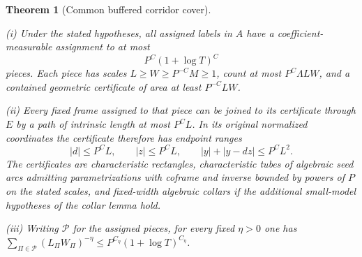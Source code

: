 \documentclass[11pt]{amsart}
\newtheorem{theorem}{Theorem}[section]
\theoremstyle{definition}
\theoremstyle{remark}
\numberwithin{equation}{section}
\begin{document}
\begin{theorem}[Common buffered corridor cover]\label{low:6:og:common-cover}

\noindent\textup{(i)} Under the stated hypotheses, all assigned labels in $A$ have a coefficient-measurable assignment to at most
\[
P^C(1+\log T)^C
\]
pieces. Each piece has scales $L\ge W\ge P^{-C}M\ge1$, count at most $P^C\Lambda LW$, and a contained geometric certificate of area at least $P^{-C}LW$.

\noindent\textup{(ii)} Every fixed frame assigned to that piece can be joined to its certificate through $E$ by a path of intrinsic length at most $P^CL$. In its original normalized coordinates the certificate therefore has endpoint ranges
\[
 |d|\le P^CL,\qquad |z|\le P^CL,\qquad |y|+|y-dz|\le P^CL^2.
\]
The certificates are characteristic rectangles, characteristic tubes of algebraic seed arcs admitting parametrizations with coframe and inverse bounded by powers of $P$ on the stated scales, and fixed-width algebraic collars if the additional small-model hypotheses of the collar lemma hold.

\noindent\textup{(iii)} Writing $\mathscr P$ for the assigned pieces, for every fixed $\eta>0$ one has $\sum_{\Pi\in\mathscr P}(L_\Pi W_\Pi)^{-\eta}\le P^{C_\eta}(1+\log T)^{C_\eta}$. 
\end{theorem}
\end{document}
